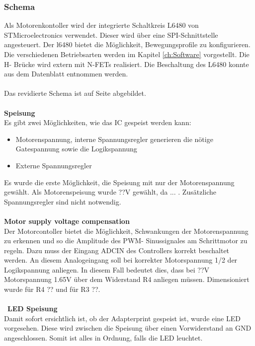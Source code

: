 	\subsubsection{Schema} \label{sec:Schema}
	\fi
	Als Motorenkontoller wird der integrierte Schaltkreis L6480 von STMicroelectronics verwendet. Dieser wird über eine SPI-Schnittstelle angesteuert. Der l6480 bietet die Möglichkeit, Bewegungsprofile zu konfigurieren. Die verschiedenen Betriebsarten werden im Kapitel \ref{ch:Software} vorgestellt. Die H- Brücke wird extern mit N-FETs realisiert. Die Beschaltung des L6480 konnte aus dem Datenblatt \cite{Datasheet:L6480} entnommen werden.\\\\ 
	Das revidierte Schema ist auf Seite \pageref{Schema} abgebildet.
	\\\\
	\textbf{Speisung}\\
	Es gibt zwei Möglichkeiten, wie das IC gespeist werden kann: 
	\begin{itemize}
		\item Motorenspannung, interne Spannungsregler generieren die nötige Gatespannung sowie die Logikspannung
		\item Externe Spannungsregler
	\end{itemize}
	Es wurde die erste Möglichkeit, die Speisung mit nur der Motorenspannung gewählt. Als Motorenspeisung wurde ??V gewählt, da ... . Zusätzliche Spannungsregler sind nicht notwendig. 
	\\\\
	\textbf{Motor supply voltage compensation}\\
	Der Motorcontoller bietet die Möglichkeit, Schwankungen der Motorenspannung zu erkennen und so die Amplitude des PWM- Sinussignales am Schrittmotor zu regeln. Dazu muss der Eingang ADCIN des Controllers korrekt beschaltet werden. An diesem Analogeingang soll bei korrekter Motorspannung 1/2 der Logikspannung anliegen. In diesem Fall bedeutet dies, dass bei ??V Motorspannung 1.65V über dem Widerstand R4 anliegen müssen. Dimensioniert wurde für R4 ?? und für R3 ??.
	\\\\\
	\textbf{LED Speisung}\\
	Damit sofort ersichtlich ist, ob der Adapterprint gespeist ist, wurde eine LED vorgesehen. Diese wird zwischen die Speisung über einen Vorwiderstand an GND angeschlossen. Somit ist alles in Ordnung, falls die LED leuchtet.
	\\\\
